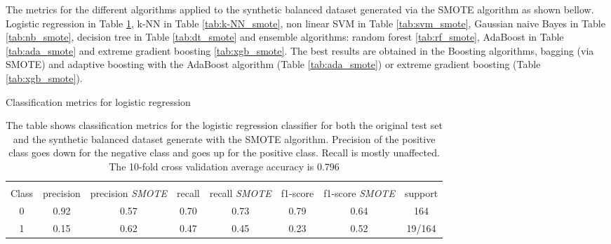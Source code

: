 \documentclass[11pt]{article}
\theoremstyle{definition}
\theoremstyle{remark}
\begin{document}
The metrics for the different algorithms applied to the synthetic balanced dataset generated via the SMOTE algorithm as shown bellow.
Logistic regression in Table \ref{tab:logreg_smote}, k-NN in Table \ref{tab:k-NN_smote}, non linear SVM in Table \ref{tab:svm_smote}, Gaussian naive Bayes in Table \ref{tab:nb_smote}, decision tree in Table \ref{tab:dt_smote} and ensemble algorithms: random forest \ref{tab:rf_smote}, AdaBoost in Table \ref{tab:ada_smote} and extreme gradient boosting \ref{tab:xgb_smote}.
The best results are obtained in the Boosting algorithms, bagging (via SMOTE) and adaptive boosting with the AdaBoost algorithm (Table \ref{tab:ada_smote}) or extreme gradient boosting (Table \ref{tab:xgb_smote}). 

\begin{table}[H]
\caption{Classification metrics for logistic regression} \label{tab:logreg_smote} 
\begin{center} 
\begin{tabular}{cccccccc}
\hline
\multicolumn{1}{c}{} \\
Class & precision & precision \textit{SMOTE}& recall & recall \textit{SMOTE}& f1-score & f1-score \textit{SMOTE} & support     \\
\hline
0 & 0.92  &  0.57 &  0.70  & 0.73 &   0.79   &  0.64 &  164 \\
1 & 0.15  &  0.62 &  0.47 &  0.45  &  0.23   &  0.52  &  19/164 \\
\hline
\end{tabular}
\caption{The table shows classification metrics for the logistic regression classifier for both the original test set and the synthetic balanced dataset generate with the SMOTE algorithm. Precision of the positive class goes down for the negative class and goes up for the positive class. Recall is mostly unaffected. The 10-fold cross validation average accuracy is 0.796}
\end{center}
\end{table}
\end{document}

